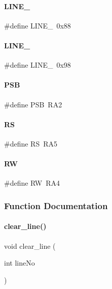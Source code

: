 \mbox{\label{a00035_aaf2ffd55ecbf422a8852d5909a1f9346}} 
\paragraph{L\+I\+N\+E\+\_}
{\footnotesize\ttfamily \#define L\+I\+N\+E\+\_~0x88}

\mbox{\label{a00035_a7c634e6f2a9e85c6e61cdd042ec0e3c6}} 
\paragraph{L\+I\+N\+E\+\_}
{\footnotesize\ttfamily \#define L\+I\+N\+E\+\_~0x98}

\mbox{\label{a00035_a85d6b002cc4fc92f98aeaae45c9ea113}} 
\paragraph{P\+SB}
{\footnotesize\ttfamily \#define P\+SB~R\+A2}

\mbox{\label{a00035_af8903d8eea3868940c60af887473b152}} 
\paragraph{RS}
{\footnotesize\ttfamily \#define RS~R\+A5}

\mbox{\label{a00035_afc4ded33ac0ca43defcce639e965748a}} 
\paragraph{RW}
{\footnotesize\ttfamily \#define RW~R\+A4}



\subsubsection{Function Documentation}
\mbox{\label{a00035_a11c0bbd236ab1ca5c7ef4626ac16c29a}} 
\paragraph{clear\+\_\+line()}
{\footnotesize\ttfamily void clear\+\_\+line (\begin{DoxyParamCaption}\item[{int}]{line\+No }\end{DoxyParamCaption})}

